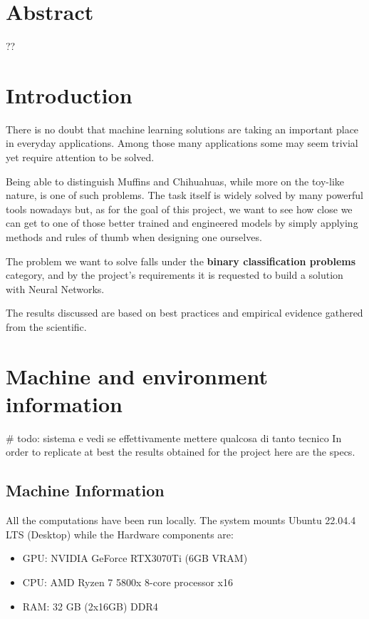 \newpage
\section{Abstract}
??


\section{Introduction}
There is no doubt that machine learning solutions are taking an important place in everyday applications.
Among those many applications some may seem trivial yet require attention to be solved.

Being able to distinguish Muffins and Chihuahuas, while more on the toy-like nature, is one of such problems.
The task itself is widely solved by many powerful tools nowadays but, as for the goal of this project, we
want to see how close we can get to one of those better trained and engineered models
by simply applying methods and rules of thumb when designing one ourselves.

The problem we want to solve falls under the \textbf{binary classification problems} category,
and by the project's requirements it is requested to build a solution with Neural Networks.

The results discussed are based on best practices and empirical evidence gathered from the scientific.


\section{Machine and environment information}
# todo: sistema e vedi se effettivamente mettere qualcosa di tanto tecnico
In order to replicate at best the results obtained for the project here are the specs.

\subsection{Machine Information}

All the computations have been run locally.
The system mounts Ubuntu 22.04.4 LTS (Desktop) while the Hardware components are:

\begin{itemize}
    \item GPU: NVIDIA GeForce RTX3070Ti (6GB VRAM)
    \item CPU: AMD Ryzen 7 5800x 8-core processor x16
    \item RAM: 32 GB (2x16GB) DDR4
\end{itemize}


